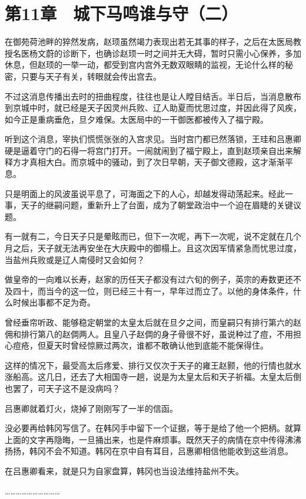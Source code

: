\section{第11章　城下马鸣谁与守（二）}

在御苑荷池畔的猝然发病，赵顼虽然竭力表现出若无其事的样子，之后在太医局教授名医杨文蔚的诊断下，也确诊赵顼一时之间并无大碍，暂时只需小心保养，多加休息，但赵顼的一举一动，都受到宫内宫外无数双眼睛的监视，无论什么样的秘密，只要与天子有关，转眼就会传出宫去。

不过这消息传播出去时的扭曲程度，往往也是让人瞠目结舌。半日后，当消息散布到京城中时，就已经是天子因灵州兵败、辽人助夏而忧思过度，并因此得了风疾，如今正是重病垂危，旦夕难保。太医局中的一干御医都被传入了福宁殿。

听到这个消息，宰执们慌慌张张的入宫求见。当时宫门都已然落锁，王珪和吕惠卿硬是逼着守门的石得一将宫门打开。一闹就闹到了福宁殿上，直到赵顼亲自出来解释方才真相大白。而京城中的骚动，到了次日早朝，天子御文德殿，这才渐渐平息。

只是明面上的风波虽说平息了，可海面之下的人心，却越发得动荡起来。经此一事，天子的继嗣问题，重新升上了台面，成为了朝堂政治中一个迫在眉睫的关键议题。

有一就有二，今日天子只是晕眩而已，但下一次呢，再下一次呢，说不定就在几个月之后，天子就无法再安坐在大庆殿中的御榻上。且这次因军情紧急而忧思过度，当盐州兵败或是辽人南侵时又会如何？

做皇帝的一向难以长寿，赵家的历任天子都没有过六旬的例子，英宗的寿数更还不及四十，而当今的这一位，则已经三十有一，早年过而立了。以他的身体条件，什么时候出事都不足为奇。

曾经垂帘听政、能够稳定朝堂的太皇太后就在旦夕之间，而皇嗣只有排行第六的赵佣和排行第八的赵倜两人。且皇八子赵倜的身子骨很不好，虽说种过了痘，不用担心痘疮，但夏天时曾经惊厥过两次，谁都不敢确认他到底能不能保得住。

这样的情况下，最受高太后疼爱、排行又仅次于天子的雍王赵颢，他的行情也就水涨船高。这几日，还去了大相国寺一趟，说是为太皇太后和天子祈福。太皇太后倒也罢了，可天子这不是没病吗？

吕惠卿就着灯火，烧掉了刚刚写了一半的信函。

没必要再给韩冈写信了。在韩冈手中留下一个证据，等于是给了他一个把柄。就算上面的文字再隐晦，一旦捅出来，也是件麻烦事。既然天子的病情在京中传得沸沸扬扬，韩冈不会不知道。韩冈在京中自有耳目，吕惠卿相信他能收到这些消息。

在吕惠卿看来，就是只为自家盘算，韩冈也当设法维持盐州不失。

…………………………


